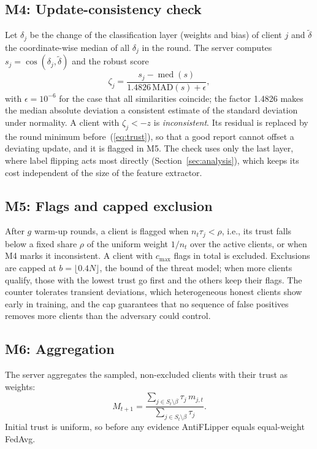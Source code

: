 \documentclass[journal]{IEEEtran}
\begin{document}
\subsection{M4: Update-consistency check}
Let $\delta_j$ be the change of the classification layer (weights and bias) of client $j$ and $\tilde\delta$ the coordinate-wise median of all $\delta_j$ in the round. The server computes $s_j=\cos(\delta_j,\tilde\delta)$ and the robust score
\begin{equation}
\zeta_j=\frac{s_j-\operatorname{med}(s)}{1.4826\,\mathrm{MAD}(s)+\epsilon},
\label{eq:cc}
\end{equation}
with $\epsilon{=}10^{-6}$ for the case that all similarities coincide; the factor 1.4826 makes the median absolute deviation a consistent estimate of the standard deviation under normality. A client with $\zeta_j<-z$ is \emph{inconsistent}. Its residual is replaced by the round minimum before~(\ref{eq:trust}), so that a good report cannot offset a deviating update, and it is flagged in M5. The check uses only the last layer, where label flipping acts most directly (Section~\ref{sec:analysis}), which keeps its cost independent of the size of the feature extractor.

\subsection{M5: Flags and capped exclusion}
After $g$ warm-up rounds, a client is flagged when $n_t\tau_j<\rho$, i.e., its trust falls below a fixed share $\rho$ of the uniform weight $1/n_t$ over the active clients, or when M4 marks it inconsistent. A client with $c_{\max}$ flags in total is excluded. Exclusions are capped at $b=\lfloor0.4N\rfloor$, the bound of the threat model; when more clients qualify, those with the lowest trust go first and the others keep their flags. The counter tolerates transient deviations, which heterogeneous honest clients show early in training, and the cap guarantees that no sequence of false positives removes more clients than the adversary could control.

\subsection{M6: Aggregation}
The server aggregates the sampled, non-excluded clients with their trust as weights:
\begin{equation}
M_{t+1}=\frac{\sum_{j\in S_t\setminus\beta}\tau_j\,m_{j,t}}{\sum_{j\in S_t\setminus\beta}\tau_j}.
\label{eq:agg}
\end{equation}
Initial trust is uniform, so before any evidence AntiFLipper equals equal-weight FedAvg.
\end{document}
